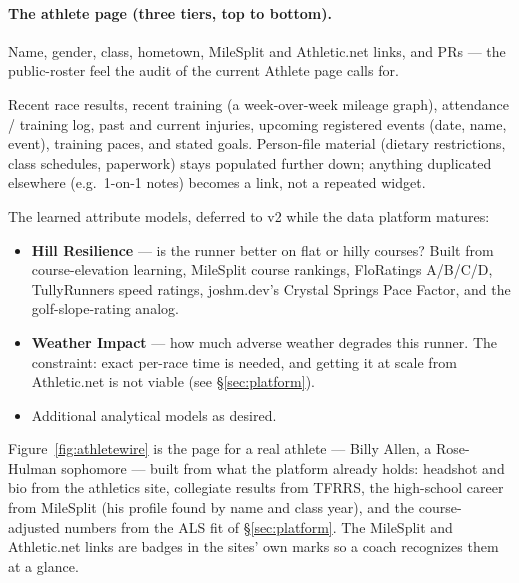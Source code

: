 \documentclass[11pt]{article}
\begin{document}
\paragraph{The athlete page (three tiers, top to bottom).}
\begin{description}[leftmargin=0em,style=nextline,itemsep=3pt]
  \item[Identity (top, glanceable).] Name, gender, class, hometown, MileSplit and Athletic.net links, and PRs --- the public-roster feel the audit of the current Athlete page calls for.
  \item[Secondary.] Recent race results, recent training (a week-over-week mileage graph), attendance / training log, past and current injuries, upcoming registered events (date, name, event), training paces, and stated goals. Person-file material (dietary restrictions, class schedules, paperwork) stays populated further down; anything duplicated elsewhere (e.g.\ 1-on-1 notes) becomes a link, not a repeated widget.
  \item[Advanced analytics (bottom --- v2).] The learned attribute models, deferred to v2 while the data platform matures:
    \begin{itemize}
      \item \textbf{Hill Resilience} --- is the runner better on flat or hilly courses? Built from course-elevation learning, MileSplit course rankings, FloRatings A/B/C/D, TullyRunners speed ratings, joshm.dev's Crystal Springs Pace Factor, and the golf-slope-rating analog.
      \item \textbf{Weather Impact} --- how much adverse weather degrades this runner. The constraint: exact per-race time is needed, and getting it at scale from Athletic.net is not viable (see \S\ref{sec:platform}).
      \item Additional analytical models as desired.
    \end{itemize}
\end{description}

Figure~\ref{fig:athletewire} is the page for a real athlete --- Billy Allen,
a Rose-Hulman sophomore --- built from what the platform already holds:
headshot and bio from the athletics site, collegiate results from TFRRS, the
high-school career from MileSplit (his profile found by name and class year),
and the course-adjusted numbers from the ALS fit of \S\ref{sec:platform}.
The MileSplit and Athletic.net links are badges in the sites' own marks so a
coach recognizes them at a glance.
\end{document}
